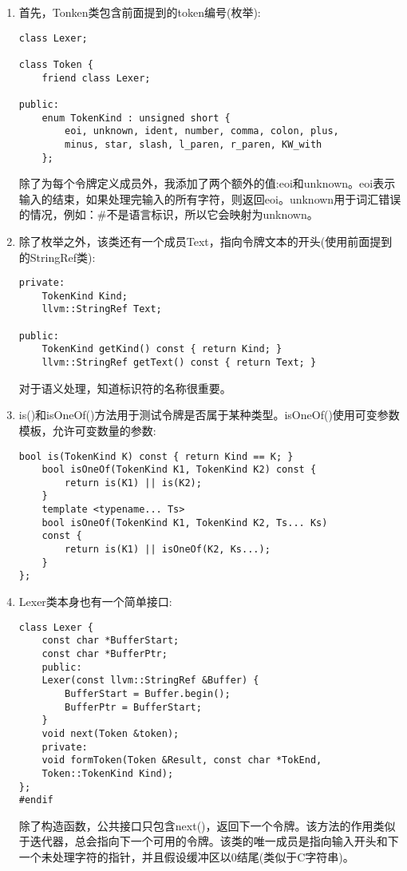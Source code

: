 \begin{enumerate}
\item 首先，Tonken类包含前面提到的token编号(枚举):
\begin{lstlisting}[caption={}]
class Lexer;

class Token {
	friend class Lexer;
	
public:
	enum TokenKind : unsigned short {
		eoi, unknown, ident, number, comma, colon, plus,
		minus, star, slash, l_paren, r_paren, KW_with
	};
\end{lstlisting}
除了为每个令牌定义成员外，我添加了两个额外的值:eoi和unknown。eoi表示输入的结束，如果处理完输入的所有字符，则返回eoi。unknown用于词汇错误的情况，例如：\#不是语言标识，所以它会映射为unknown。 
	
\item 除了枚举之外，该类还有一个成员Text，指向令牌文本的开头(使用前面提到的StringRef类):
\begin{lstlisting}[caption={}]
private:
	TokenKind Kind;
	llvm::StringRef Text;

public:
	TokenKind getKind() const { return Kind; }
	llvm::StringRef getText() const { return Text; }
\end{lstlisting}
对于语义处理，知道标识符的名称很重要。
	
\item is()和isOneOf()方法用于测试令牌是否属于某种类型。isOneOf()使用可变参数模板，允许可变数量的参数:
\begin{lstlisting}[caption={}]
	bool is(TokenKind K) const { return Kind == K; }
	bool isOneOf(TokenKind K1, TokenKind K2) const {
		return is(K1) || is(K2);
	}
	template <typename... Ts>
	bool isOneOf(TokenKind K1, TokenKind K2, Ts... Ks)
	const {
		return is(K1) || isOneOf(K2, Ks...);
	}
};
\end{lstlisting}

\item Lexer类本身也有一个简单接口:
\begin{lstlisting}[caption={}]
class Lexer {
	const char *BufferStart;
	const char *BufferPtr;
	public:
	Lexer(const llvm::StringRef &Buffer) {
		BufferStart = Buffer.begin();
		BufferPtr = BufferStart;
	}
	void next(Token &token);
	private:
	void formToken(Token &Result, const char *TokEnd,
	Token::TokenKind Kind);
};
#endif
\end{lstlisting}
除了构造函数，公共接口只包含next()，返回下一个令牌。该方法的作用类似于迭代器，总会指向下一个可用的令牌。该类的唯一成员是指向输入开头和下一个未处理字符的指针，并且假设缓冲区以0结尾(类似于C字符串)。
	

\end{enumerate}

